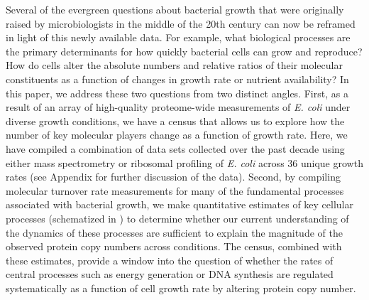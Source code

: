 Several of the evergreen questions about bacterial growth that were originally
raised by microbiologists in the middle of the 20th century can now be reframed
in light of this newly available data. For example, what biological processes
are the primary determinants for how quickly bacterial cells can grow and
reproduce? How do cells alter the absolute numbers and relative ratios of their
molecular constituents as a function of changes in growth rate or nutrient
availability? In this paper, we address these two questions from two distinct
angles. First, as a result of an array of high-quality proteome-wide
measurements of \textit{E. coli} under diverse growth conditions, we have a
census that allows us to explore how the number of key molecular players change
as a function of growth rate. Here, we have compiled a combination of data sets
collected over the past decade using either mass spectrometry
\citep{schmidt2016, peebo2015, valgepea2013} or ribosomal profiling
\citep{li2014} of \textit{E. coli} across 36 unique growth rates (see Appendix
 for further discussion of the data). Second, by
compiling molecular turnover rate measurements for many of the fundamental
processes associated with bacterial growth, we make quantitative estimates of
key cellular processes (schematized in ) to determine whether
our current understanding of the dynamics of these processes are sufficient to
explain the magnitude of the observed protein copy numbers across conditions.
The census, combined with these estimates, provide a window into the question of
whether the rates of central processes such as energy generation or DNA
synthesis are regulated systematically as a function of cell growth rate by
altering protein copy number.


